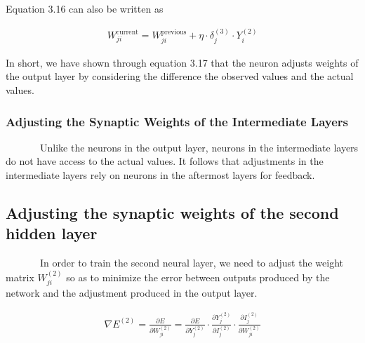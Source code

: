 \documentclass[
  12pt,
]{report}
\begin{document}
Equation 3.16 can also be written as

\vspace{-1em}

\begin{equation}
\begin{aligned}
W_{ji}^{\text{current}} = W_{ji}^{\text{previous}} + \eta \cdot \delta_j^{(3)} \cdot Y_i^{(2)}
\label{eq:equation 3.18}
\end{aligned}
\end{equation} \vspace{-1em}

In short, we have shown through equation 3.17 that the neuron adjusts
weights of the output layer by considering the difference the observed
values and the actual values.

\subsubsection{Adjusting the Synaptic Weights of the Intermediate
Layers}\label{adjusting-the-synaptic-weights-of-the-intermediate-layers}

~~~~~~~Unlike the neurons in the output layer, neurons in the
intermediate layers do not have access to the actual values. It follows
that adjustments in the intermediate layers rely on neurons in the
aftermost layers for feedback.

\subsection{Adjusting the synaptic weights of the second hidden
layer}\label{adjusting-the-synaptic-weights-of-the-second-hidden-layer}

~~~~~~~In order to train the second neural layer, we need to adjust the
weight matrix \(W_{ji}^{(2)}\) so as to minimize the error between
outputs produced by the network and the adjustment produced in the
output layer.

\vspace{-1em}

\begin{equation}
\begin{aligned}
\nabla E^{(2)} = \frac{\partial E}{\partial W_{ji}^{(2)}} = \frac{\partial E}{\partial Y_j^{(2)}} \cdot \frac{\partial Y_j^{(2)}}{\partial I_j^{(2)}} \cdot \frac{\partial I_j^{(2)}}{\partial W_{ji}^{(2)}}
\label{eq:equation 3.19}
\end{aligned}
\end{equation} \vspace{-1em}
\end{document}
